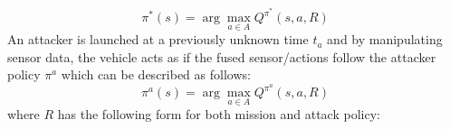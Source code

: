 \documentclass[letterpaper, 10 pt, conference]{ieeeconf}  %
\newtheorem{problem}{Problem}
\newcommand\NB[1]{$\spadesuit$\footnote{NB: #1}}
\begin{document}
\begin{equation}
\pi^*(s) = \arg\!\max_{a\in A} Q^{\pi^*}(s,a,R)
\label{eq:pistar}
\end{equation}
An attacker is launched at a previously unknown time $t_a$ and by manipulating sensor data, the vehicle acts as if the fused sensor/actions follow the attacker policy $\pi^a$ which can be described as follows:
\begin{equation}
\pi^a(s) = \arg\!\max_{a\in A} Q^{\pi^a}(s,a,R)
\end{equation}
where $R$ has the following form for both mission and attack policy:
%
\end{document}
